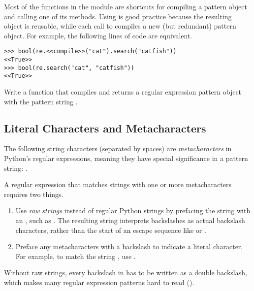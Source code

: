 Most of the functions in the  module are shortcuts for compiling a pattern object and calling one of its methods.
Using  is good practice because the resulting object is reusable, while each call to  compiles a new (but redundant) pattern object.
For example, the following lines of code are equivalent.
\begin{lstlisting}
>>> bool(re.<<compile>>("cat").search("catfish"))
<<True>>
>>> bool(re.search("cat", "catfish"))
<<True>>
\end{lstlisting}


\begin{problem} %
Write a function that compiles and returns a regular expression pattern object with the pattern string .
\label{prob:regex-superbasic}
\end{problem}

\subsection*{Literal Characters and Metacharacters} %

The following string characters (separated by spaces) are \emph{metacharacters} in Python's regular expressions, meaning they have special significance in a pattern string:
.

A regular expression that matches strings with one or more metacharacters  requires two things.
\begin{enumerate}
    \item Use \emph{raw strings} instead of regular Python strings by prefacing the string with an , such as .
The resulting string interprets backslashes as actual backslash characters, rather than the start of an escape sequence like \li{\\n} or \li{\\t}.
    \item Preface any metacharacters with a backslash to indicate a literal character.
For example, to match the string , use .

\end{enumerate}
Without raw strings, every backslash in has to be written as a double backslash, which makes many regular expression patterns hard to read ().

